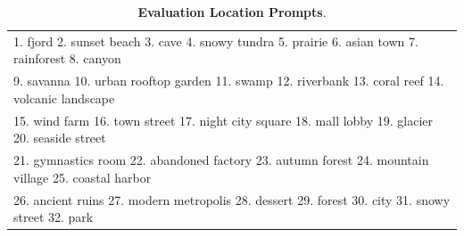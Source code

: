 \begin{table}[!ht]

\caption{\textbf{Evaluation Location Prompts}. }
\label{tab:location_prompts}

\begin{threeparttable}
\resizebox{.99\textwidth}{!} 
{
\begin{tabular}{l}
\toprule
1. fjord 2. sunset beach 3. cave 4. snowy tundra 5. prairie 6. asian town 7. rainforest 8. canyon\\
9. savanna 10. urban rooftop garden 11. swamp 12. riverbank 13. coral reef 14. volcanic landscape \\
15. wind farm 16. town street 17. night city square 18. mall lobby 19. glacier 20. seaside street 
\\
21. gymnastics room 22. abandoned factory 23. autumn forest 24. mountain village 25. coastal harbor \\
26. ancient ruins 27. modern metropolis 28. dessert 29. forest 30. city 31. snowy street 32. park \\

\bottomrule

\end{tabular}
}

\end{threeparttable}
\end{table}
